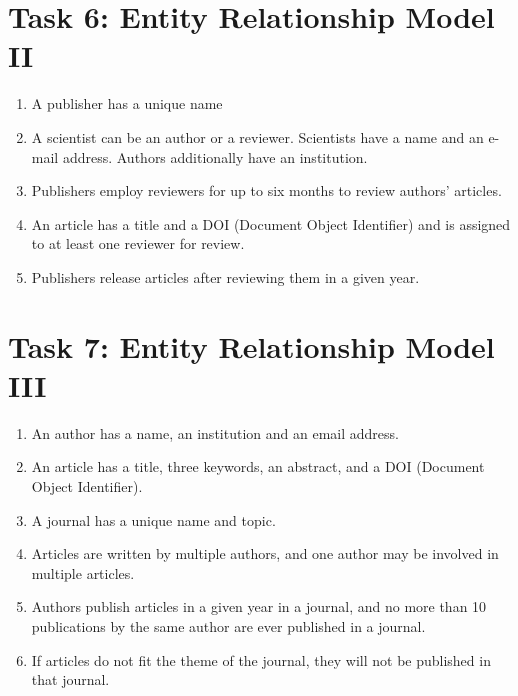 \documentclass[10pt,a4paper]{article}
\begin{document}

\section*{Task 6: Entity Relationship Model II}
\begin{enumerate}
\item A publisher has a unique name

\item A scientist can be an author or a reviewer. Scientists have a name and an e-mail address.
Authors additionally have an institution.

\item Publishers employ reviewers for up to six months to review authors’ articles.

\item An article has a title and a DOI (Document Object Identifier) and is assigned to at least one
reviewer for review.

\item Publishers release articles after reviewing them in a given year.
\end{enumerate}



\section*{Task 7: Entity Relationship Model III}
\begin{enumerate}
\item An author has a name, an institution and an email address.

\item An article has a title, three keywords, an abstract, and a DOI (Document Object Identifier).

\item A journal has a unique name and topic.

\item Articles are written by multiple authors, and one author may be involved in multiple articles.

\item Authors publish articles in a given year in a journal, and no more than 10 publications by
the same author are ever published in a journal.

\item If articles do not fit the theme of the journal, they will not be published in that journal.
\end{enumerate}
\end{document}

